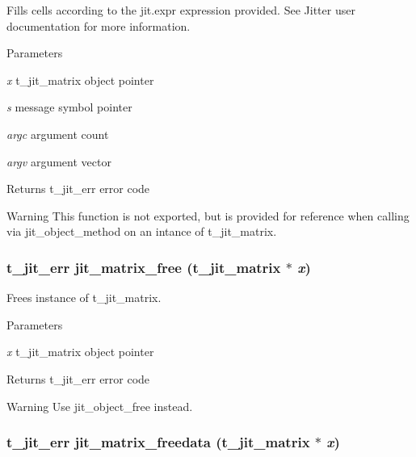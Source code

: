 Fills cells according to the jit.expr expression provided. See Jitter user documentation for more information.


\begin{DoxyParams}{Parameters}
\item[{\em x}]t\_\-jit\_\-matrix object pointer \item[{\em s}]message symbol pointer \item[{\em argc}]argument count \item[{\em argv}]argument vector\end{DoxyParams}
\begin{DoxyReturn}{Returns}
t\_\-jit\_\-err error code
\end{DoxyReturn}
\begin{DoxyWarning}{Warning}
This function is not exported, but is provided for reference when calling via jit\_\-object\_\-method on an intance of t\_\-jit\_\-matrix. 
\end{DoxyWarning}
\hypertarget{group__matrixmod_gafcd9da344bd48c0e38b36d2d70451125}{
\subsubsection[{jit\_\-matrix\_\-free}]{\setlength{\rightskip}{0pt plus 5cm}t\_\-jit\_\-err jit\_\-matrix\_\-free (t\_\-jit\_\-matrix $\ast$ {\em x})}}
\label{group__matrixmod_gafcd9da344bd48c0e38b36d2d70451125}


Frees instance of t\_\-jit\_\-matrix. 
\begin{DoxyParams}{Parameters}
\item[{\em x}]t\_\-jit\_\-matrix object pointer\end{DoxyParams}
\begin{DoxyReturn}{Returns}
t\_\-jit\_\-err error code
\end{DoxyReturn}
\begin{DoxyWarning}{Warning}
Use jit\_\-object\_\-free instead. 
\end{DoxyWarning}
\hypertarget{group__matrixmod_gaa3dcbf132ba94af59d39ec1b0a20aba2}{
\subsubsection[{jit\_\-matrix\_\-freedata}]{\setlength{\rightskip}{0pt plus 5cm}t\_\-jit\_\-err jit\_\-matrix\_\-freedata (t\_\-jit\_\-matrix $\ast$ {\em x})}}
\label{group__matrixmod_gaa3dcbf132ba94af59d39ec1b0a20aba2}


